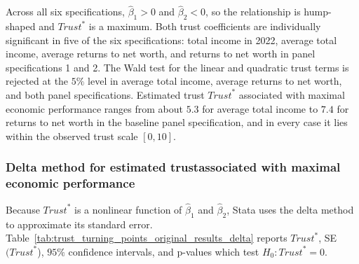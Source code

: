 \par Across all six specifications, \(\hat\beta_1 > 0\) and \(\hat\beta_2 < 0\), so the relationship is hump-shaped and \(\textit{Trust}^*\) is a maximum. Both trust coefficients are individually significant in five of the six specifications: total income in 2022, average total income, average returns to net worth, and returns to net worth in panel specifications 1 and 2. The Wald test for the linear and quadratic trust terms is rejected at the \(5\%\) level in average total income, average returns to net worth, and both panel specifications. Estimated trust \(\textit{Trust}^*\) associated with maximal economic performance ranges from about \(5.3\) for average total income to \(7.4\) for returns to net worth in the baseline panel specification, and in every case it lies within the observed trust scale \([0, 10]\).

\subsubsection{Delta method for estimated trustassociated with maximal economic performance}

\par Because \(\textit{Trust}^*\) is a nonlinear function of \(\hat\beta_1\) and \(\hat\beta_2\), Stata uses the delta method to approximate its standard error. Table~\ref{tab:trust_turning_points_original_results_delta} reports \(\textit{Trust}^*\), SE\((\textit{Trust}^*\)), $95\%$ confidence intervals, and p-values which test \(H_0: \textit{Trust}^* = 0\). 
\label{tab:trust_turning_points_original_results_delta}
\FloatBarrier
